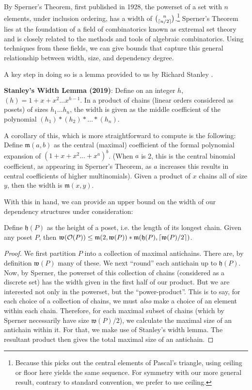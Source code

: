 \documentclass[a4paper,USenglish,cleveref, autoref, thm-restate,authorcolumns]{lipics-v2019}
\newcommand{\Oc}{\mathcal{O}}
\newcommand{\Mf}{\mathfrak{m}}
\newcommand{\Wf}{\mathfrak{w}}
\newcommand{\Hf}{\mathfrak{h}}
\DeclarePairedDelimiter\ceil{\lceil}{\rceil}
\begin{document}
By Sperner's Theorem, first published in 1928, the powerset of a set with \(n\) elements, under inclusion ordering, has a width of \(\binom{n}{\ceil{n/2}}\).\footnote{Because this picks out the central elements of Pascal's triangle, using ceiling or floor here yields the same sequence. For symmetry with our more general result, contrary to standard convention, we prefer to use ceiling.}  Sperner's Theorem lies at the foundation of a field of combinatorics known as extremal set theory and is closely related to the methods and tools of algebraic combinatorics. Using techniques from these fields, we can give bounds that capture this general relationship between width, size, and dependency degree.

A key step in doing so is a lemma provided to us by Richard Stanley \cite{343183}.

\begin{lemma}
\textbf{Stanley's Width Lemma (2019)}: Define on an integer \(h\), \((h) = 1 + x + x^2 \ldots x^{h-1}\). In a product of chains (linear orders considered as posets) of sizes \(h_1 \ldots h_n\), the width is given as the middle coefficient of the polynomial \((h_1) * (h_2) * \ldots * (h_n)\).
\end{lemma}

A corollary of this, which is more straightforward to compute is the following:  Define \(\Mf(a,b)\) as the central (maximal) coefficient of the formal polynomial expansion of \((1 + x + x^2 ... + x^a)^b\). (When \(a\) is 2, this is the central binomial coefficient, as appearing in Sperner's Theorem, as \(a\) increases this results in central coefficients of higher multinomials). Given a product of \(x\) chains all of size \(y\), then the width is \(\Mf(x,y)\).

With this in hand, we can provide an upper bound on the width of our dependency structures under consideration:

\begin{theorem}
Define \(\Hf(P)\) as the height of a poset, i.e. the length of its longest chain. Given any poset \(P\), then \(\Wf(\Oc(P)) \le \Mf(2,\Wf(P)) * \Mf(\Hf(P),\ceil{\Wf(P)/2})\).
\end{theorem}

\begin{proof} 
We first partition \(P\) into a collection of maximal antichains. There are, by definition \(\Wf(P)\) many of these. We next ``round'' each antichain up to \(\Hf(P)\). Now, by Sperner, the powerset of this collection of chains (considered as a discrete set) has the width given in the first half of our product. But we are interested not only in the powerset, but the ``power-product''. This is to say, for each choice of a collection of chains, we must \textit{also} make a choice of an element within each chain. Therefore, for each maximal subset of chains (which by Sperner necessarily have size \(\Wf(P)/2\)), we calculate the maximal size of an antichain within it. For that, we make use of Stanley's width lemma. The resultant product then gives the total maximal size of an antichain.
\end{proof}
\end{document}
